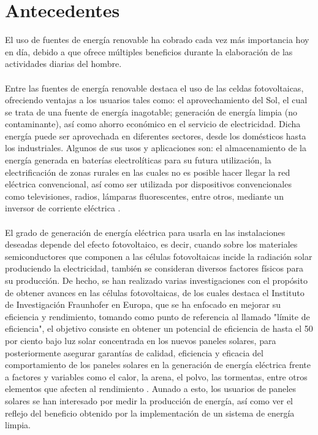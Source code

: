 
\section{Antecedentes} %
El uso de fuentes de energía renovable ha cobrado cada vez más importancia hoy en día, debido a que ofrece múltiples beneficios durante la elaboración de las actividades diarias del hombre. 
\paragraph{}
Entre las fuentes de energía renovable destaca el uso de las celdas fotovoltaicas, ofreciendo ventajas a los usuarios tales como: el aprovechamiento del Sol, el cual se trata de una fuente de energía inagotable; generación de energía limpia (no contaminante), así como ahorro económico en el servicio de electricidad. Dicha energía puede ser aprovechada en diferentes sectores, desde los domésticos hasta los industriales. Algunos de sus usos y aplicaciones son: el almacenamiento de la energía generada en baterías electrolíticas para su futura utilización, la electrificación de zonas rurales en las cuales no es posible hacer llegar la red eléctrica convencional, así como ser utilizada por dispositivos convencionales como televisiones, radios, lámparas fluorescentes, entre otros, mediante un inversor de corriente eléctrica \citep{Pre1}.   
\paragraph{}
El grado de generación de energía eléctrica para usarla en las instalaciones deseadas depende del efecto fotovoltaico, es decir, cuando sobre los materiales semiconductores que componen a las células fotovoltaicas incide la radiación solar produciendo la electricidad, también se consideran diversos factores físicos para su producción. De hecho, se han realizado varias investigaciones con el propósito de obtener avances en las células fotovoltaicas, de los cuales destaca el Instituto de Investigación Fraunhofer en Europa, que se ha enfocado en mejorar su eficiencia y rendimiento, tomando como punto de referencia al llamado "límite de eficiencia", el objetivo consiste en obtener un potencial de eficiencia de hasta el 50 por ciento bajo luz solar concentrada en los nuevos paneles solares, para posteriormente asegurar garantías de calidad, eficiencia y eficacia del comportamiento de los paneles solares en la generación de energía eléctrica frente a factores y variables como el calor, la arena, el polvo, las tormentas, entre otros elementos que afecten al rendimiento \citep{Pre1}. Aunado a esto, los usuarios de paneles solares se han interesado por medir la producción de energía, así como ver el reflejo del beneficio obtenido por la implementación de un sistema de energía limpia. 


